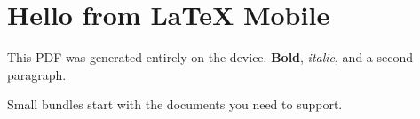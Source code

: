 \documentclass{article}
\begin{document}
\section{Hello from LaTeX Mobile}
This PDF was generated entirely on the device.
\textbf{Bold}, \textit{italic}, and a second paragraph.

Small bundles start with the documents you need to support.
\end{document}
